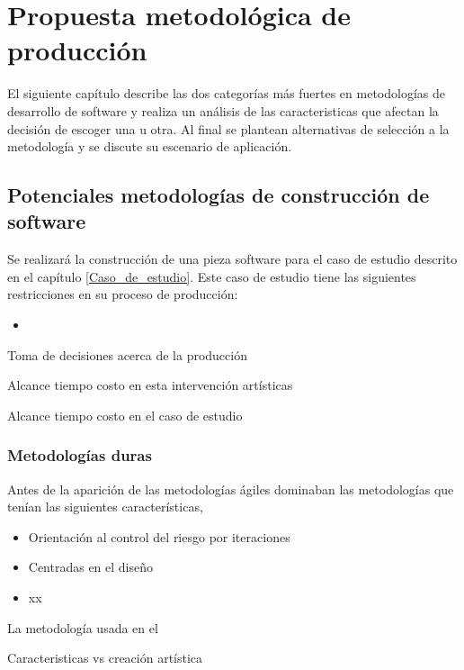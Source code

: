 
\chapter{Propuesta metodológica de producción}
\label{capitulometodologia}

El siguiente capítulo describe las dos categorías más fuertes en metodologías de desarrollo de software y realiza un análisis de las caracteristicas que afectan la decisión de escoger una u otra. Al final se plantean alternativas de selección a la metodología y se discute su escenario de aplicación.

\section{Potenciales metodologías de construcción de software}

Se realizará la construcción de una pieza software para el caso de estudio descrito en el capítulo \ref{Caso_de_estudio}. Este caso de estudio tiene las siguientes restricciones en su proceso de producción:

\begin{itemize}
  \item
\end{itemize}

Toma de decisiones acerca de la producción

Alcance tiempo costo en esta intervención artísticas

Alcance tiempo costo en el caso de estudio

\subsection{Metodologías duras}

Antes de la aparición de las metodologías ágiles dominaban las metodologías que tenían las siguientes características,

\begin{itemize}
  \item Orientación al control del riesgo por iteraciones
  \item Centradas en el diseño
  \item xx
\end{itemize}

La metodología usada en el

Caracteristicas vs creación artística

